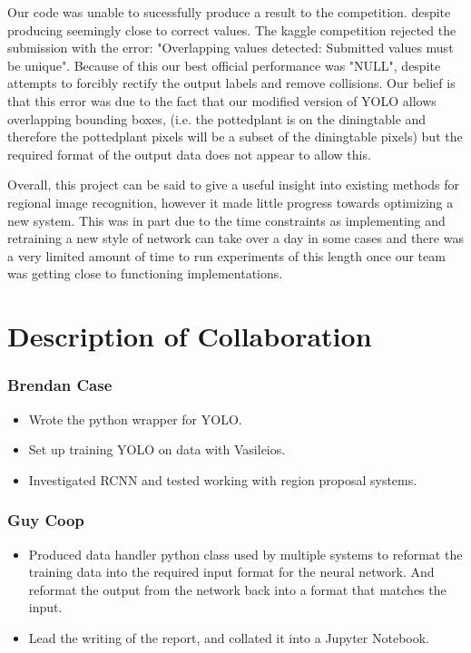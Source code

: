 \documentclass[11pt]{article}
\begin{document}
Our code was unable to sucessfully produce a result to the competition.
despite producing seemingly close to correct values. The kaggle
competition rejected the submission with the error: "Overlapping values
detected: Submitted values must be unique". Because of this our best
official performance was "NULL", despite attempts to forcibly rectify
the output labels and remove collisions. Our belief is that this error
was due to the fact that our modified version of YOLO allows overlapping
bounding boxes, (i.e. the pottedplant is on the diningtable and
therefore the pottedplant pixels will be a subset of the diningtable
pixels) but the required format of the output data does not appear to
allow this.

Overall, this project can be said to give a useful insight into existing
methods for regional image recognition, however it made little progress
towards optimizing a new system. This was in part due to the time
constraints as implementing and retraining a new style of network can
take over a day in some cases and there was a very limited amount of
time to run experiments of this length once our team was getting close
to functioning implementations.

    \section{Description of
Collaboration}\label{description-of-collaboration}

\subsubsection*{Brendan Case}\label{brendan-case}

\begin{itemize}
\item
  Wrote the python wrapper for YOLO.
\item
  Set up training YOLO on data with Vasileios.
\item
  Investigated RCNN and tested working with region proposal systems.
\end{itemize}

\subsubsection*{Guy Coop}\label{guy-coop}

\begin{itemize}
\item
  Produced data handler python class used by multiple systems to
  reformat the training data into the required input format for the
  neural network. And reformat the output from the network back into a
  format that matches the input.
\item
  Lead the writing of the report, and collated it into a Jupyter
  Notebook.
\end{itemize}
\end{document}
